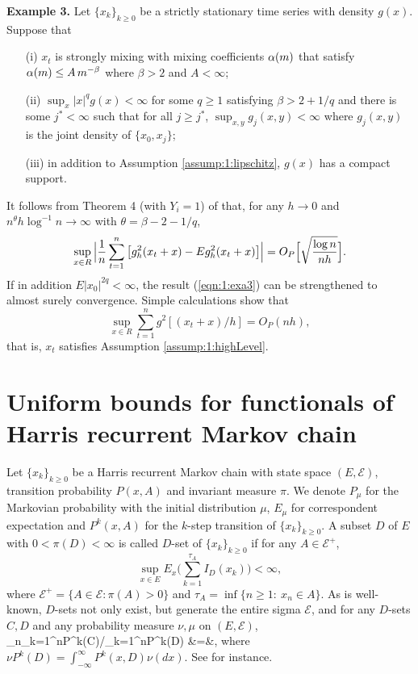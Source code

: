 \medskip
{\bf Example 3.}  Let $\{x_k\}_{k\ge0}$ be a strictly stationary time series with density $g(x)$. Suppose that
 \begin{itemize}
\item [(i)] $x_t$ is strongly mixing with mixing coefficients $\alpha(m)$ that satisfy  $\alpha(m) \le A\, m^{-\beta}$ where $\beta > 2 $ and $A < \infty$;
\item[(ii)] $\sup_x|x|^q g(x) < \infty$ for some $q\ge 1$ satisfying $\beta>2+1/q$ and there is some $j^* < \infty$ such that for all $j \ge j^*$, $\sup_{x, y} g_j(x, y) < \infty$ where $g_j(x, y)$ is the joint density of $\{x_0, x_j\}$;
\item[(iii)] in addition to Assumption \ref{assump:1:lipschitz}, $g(x)$ has a compact support.
\end{itemize}
 It follows from Theorem 4 (with $Y_i=1$) of \cite{hansen2008} that,
for any $h \rightarrow 0$ and $n^{\theta}h \log^{-1}n \rightarrow \infty$
with $\theta=\beta-2-1/q$,
\begin{equation}
\sup_{x \in  R} \Big | \frac{1}{n} \sum_{t =1}^{n} \big[g_h^2(x_t + x) - Eg_h^2(x_t + x)\big] \Big | = O_P \Big [\sqrt{\frac{\log n}{nh}}  \Big ]. \la {eqn:1:exa3}
\end{equation}
If in addition $E|x_0|^{2q}<\infty$, the result (\ref {eqn:1:exa3}) can be strengthened to  almost surely convergence. Simple calculations show that
\begin{equation}
\sup_{x \in  R} \sum_{t =1}^{n} g^2[(x_t + x)/h] = O_P(nh),
\end{equation}
that is, $x_t$ satisfies Assumption \ref{assump:1:highLevel}.


\section{Uniform bounds for functionals of Harris recurrent Markov chain} 

 Let $\{x_k\}_{k\ge 0}$ be a Harris recurrent Markov chain with state space $(E, \mathcal{E})$,
transition probability $P(x, A)$ and invariant measure $\pi$. We denote $P_\mu$ for the Markovian probability
with the initial distribution $\mu$, $E_\mu$ for correspondent expectation and $P^k(x, A)$
for the $k$-step transition of $\{x_k\}_{k\ge 0}$.  A subset $D$ of $E$ with $0<\pi(D)<\infty$ is called $D$-set of $\{x_k\}_{k\ge 0}$ if for any $A\in \mathcal{E}^+$,
$$
\sup_{x\in E} E_x\big(\sum_{k=1}^{\tau_A}I_D(x_k)\big)<\infty,
$$
where $ \mathcal{E}^+=\{A\in  \mathcal{E}: \pi(A)>0\}$ and $\tau_A=\inf\{n\ge 1: \ x_n\in A\}$. As is well-known,
$D$-sets not only exist,  but generate the entire sigma $\mathcal{E}$, and
 for any $D$-sets $C, D$ and any probability measure $\nu, \mu$ on $(E, \mathcal{E})$,
\be
\lim_{n\to\infty}\sum_{k=1}^n\nu P^k(C)/\sum_{k=1}^n\mu P^k(D) &=&, 
\ee
where $\nu P^k(D) =\int_{-\infty}^{\infty} P^k(x, D)\nu(dx)$. See \cite{nummelin2004} for instance.

